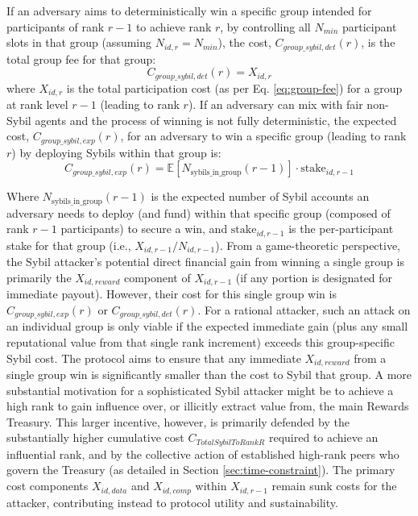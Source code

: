 \documentclass{article}
\begin{document}
\begin{CJK}{UTF8}{gbsn}
        If an adversary aims to deterministically win a specific group intended for participants of rank $r-1$ to achieve rank $r$, by controlling all $N_{min}$ participant slots in that group (assuming $N_{id,r} = N_{min}$), the cost, $C_{group\_sybil,det}(r)$, is the total group fee for that group:
        \begin{equation}
            \label{eq:sybil_cost_one_group_deterministic}
            C_{group\_sybil,det}(r) = X_{id,r}
        \end{equation}
        where $X_{id,r}$ is the total participation cost (as per Eq. \ref{eq:group-fee}) for a group at rank level $r-1$ (leading to rank $r$).
        If an adversary can mix with fair non-Sybil agents and the process of winning is not fully deterministic, the expected cost, $C_{group\_sybil,exp}(r)$, for an adversary to win a specific group (leading to rank $r$) by deploying Sybils within that group is:
        \begin{equation}
            \label{eq:sybil_cost_one_group_expected}
            C_{group\_sybil,exp}(r) = \mathbb{E}[N_{\text{sybils\_in\_group}}(r-1)] \cdot \text{stake}_{id,r-1}
        \end{equation}


        Where $N_{\text{sybils\_in\_group}}(r-1)$ is the expected number of Sybil accounts an adversary needs to deploy (and fund) within that specific group (composed of rank $r-1$ participants) to secure a win, and $\text{stake}_{id,r-1}$ is the per-participant stake for that group (i.e., $X_{id,r-1}/N_{id,r-1}$).
        From a game-theoretic perspective, the Sybil attacker's potential direct financial gain from winning a single group is primarily the $X_{id,reward}$ component of $X_{id,r-1}$ (if any portion is designated for immediate payout). However, their cost for this single group win is $C_{group\_sybil,exp}(r)$ or $C_{group\_sybil,det}(r)$. For a rational attacker, such an attack on an individual group is only viable if the expected immediate gain (plus any small reputational value from that single rank increment) exceeds this group-specific Sybil cost. The protocol aims to ensure that any immediate $X_{id,reward}$ from a single group win is significantly smaller than the cost to Sybil that group. A more substantial motivation for a sophisticated Sybil attacker might be to achieve a high rank to gain influence over, or illicitly extract value from, the main Rewards Treasury. This larger incentive, however, is primarily defended by the substantially higher cumulative cost $C_{TotalSybilToRankR}$ required to achieve an influential rank, and by the collective action of established high-rank peers who govern the Treasury (as detailed in Section \ref{sec:time-constraint}). The primary cost components $X_{id,data}$ and $X_{id,comp}$ within $X_{id,r-1}$ remain sunk costs for the attacker, contributing instead to protocol utility and sustainability.


\end{CJK}
\end{document}
